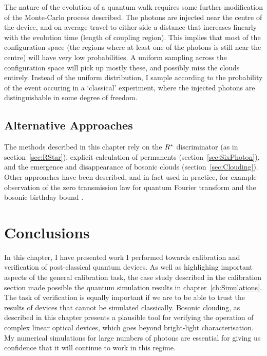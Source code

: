 The nature of the evolution of a quantum walk requires some further modification
of the Monte-Carlo process described. The photons are injected near the centre
of the device, and on average travel to either side a distance that increases
linearly with the evolution time (length of coupling region). This implies that
most of the configuration space (the regions where at least one of the photons
is still near the centre) will have very low probabilities. A uniform sampling
across the configuration space will pick up mostly these, and possibly miss the
clouds entirely. Instead of the uniform distribution, I sample according to the
probability of the event occuring in a `classical' experiment, where the
injected photons are distinguishable in some degree of freedom.

\subsection{Alternative Approaches}
\label{sec:QCVAlternatives}
The methods described in this chapter rely on the \(R^{*}\) discriminator (as
in section~\ref{sec:RStar}), explicit calculation of permanents
(section~\ref{sec:SixPhoton}), and the emergence and disappearance of bosonic
clouds (section~\ref{sec:Clouding}). Other approaches have been described, and
in fact used in practice, for example observation of the zero transmission law
for quantum Fourier transform \cite{ztl, tichy-verification} and the bosonic
birthday bound \cite{birthdays, experimental-birthdays}.

\section{Conclusions}
In this chapter, I have presented work I performed towards calibration and
verification of post-classical quantum devices. As well as highlighing important
aspects of the general calibration task, the case study described in the
calibration section made possible the quantum simulation results in
chapter~\ref{ch:Simulations}. The task of verification is equally important if
we are to be able to trust the results of devices that cannot be simulated
classically. Bosonic clouding, as described in this chapter presents a plausible
tool for verifying the operation of complex linear optical devices, which goes
beyond bright-light characterisation. My numerical simulations for large numbers
of photons are essential for giving us confidence that it will continue to work
in this regime.





